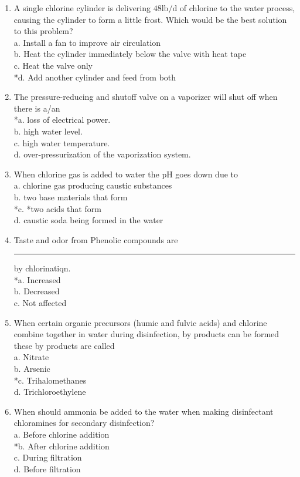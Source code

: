 \begin{enumerate}[1.]
 \item A single chlorine cylinder is delivering $48 \mathrm{lb} / \mathrm{d}$ of chlorine to the water process, causing the cylinder to form a little frost. Which would be the best solution to this problem?\\
a. Install a fan to improve air circulation\\
b. Heat the cylinder immediately below the valve with heat tape\\
c. Heat the valve only\\
*d. Add another cylinder and feed from both\\


  \item The pressure-reducing and shutoff valve on a vaporizer will shut off when there is a/an\\
*a. loss of electrical power.\\
b. high water level.\\
c. high water temperature.\\
d. over-pressurization of the vaporization system. 

  \item When chlorine gas is added to water the $\mathrm{pH}$ goes down due to\\
a. chlorine gas producing caustic substances\\
b. two base materials that form\\
*c. *two acids that form\\
d. caustic soda being formed in the water 

\item Taste and odor from Phenolic compounds are \rule{1.5cm}{0.5pt} by chlorinatiqn.\\
*a. Increased\\
b. Decreased\\
c. Not affected\\

\item When certain organic precursors (humic and fulvic acids) and chlorine combine together in water during disinfection, by products can be formed these by products are called\\
a.	Nitrate\\
b.	Arsenic\\
*c.	Trihalomethanes\\
d.	Trichloroethylene\\

\item When should ammonia be added to the water when making disinfectant chloramines for secondary disinfection?\\
a.	Before chlorine addition\\
*b.	After chlorine addition\\
c.	During filtration\\
d.	Before filtration\\



\end{enumerate}
